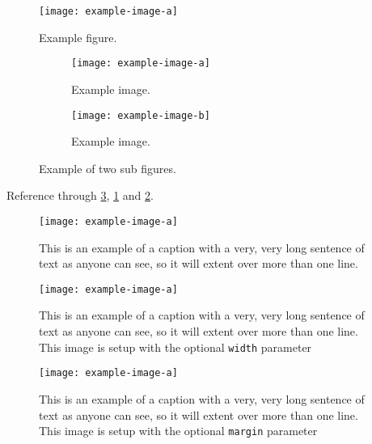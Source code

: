 \documentclass[a4paper]{article}
\begin{document}
\kant[1]

\begin{figure}[!ht]\centering
\texttt{[image: example-image-a]}
\caption{Example figure.}
\end{figure}

\kant[2]

\begin{figure}[!ht]
\begin{subfigure}[c]{0.5\textwidth}
\centering
\texttt{[image: example-image-a]}
\caption{Example image.}
\label{fig:exa}
\end{subfigure}%
\begin{subfigure}[c]{0.5\textwidth}
\centering
\texttt{[image: example-image-b]}
\caption{Example image.}
\label{fig:exb}
\end{subfigure}
\caption{Example of two sub figures.}
\label{fig:ex}
\end{figure}


Reference through \ref{fig:ex}, \ref{fig:exa} and \ref{fig:exb}.

\newpage

\begin{figure}[!ht]
  \centering
  \texttt{[image: example-image-a]}
  \caption{This is an example of a caption with a very, very long sentence of text as anyone can see, so it will extent over more than one line.}
\end{figure}

\begin{figure}[!ht]
  \centering
  \captionsetup{format=hang,justification=justified,width=0.7\textwidth}
  \texttt{[image: example-image-a]}
  \caption{This is an example of a caption with a very, very long sentence of text as anyone can see, so it will extent over more than one line. This image is setup with the optional \texttt{width} parameter}
\end{figure}

\begin{figure}[!ht]
  \centering
  \captionsetup{format=hang,justification=justified,margin=0.15\textwidth}
  \texttt{[image: example-image-a]}
  \caption{This is an example of a caption with a very, very long sentence of text as anyone can see, so it will extent over more than one line. This image is setup with the optional \texttt{margin} parameter}
\end{figure}
\end{document}
